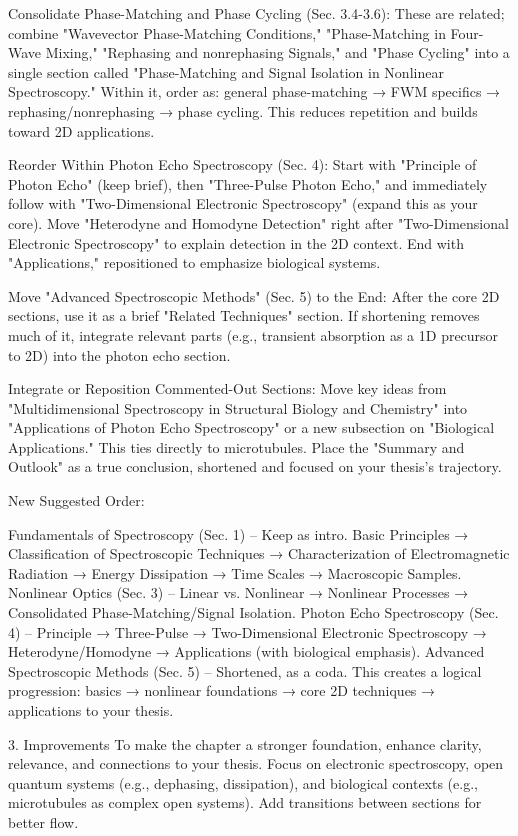 {Consolidate Phase-Matching and Phase Cycling (Sec. 3.4-3.6): These are related; combine "Wavevector Phase-Matching Conditions," "Phase-Matching in Four-Wave Mixing," "Rephasing and nonrephasing Signals," and "Phase Cycling" into a single section called "Phase-Matching and Signal Isolation in Nonlinear Spectroscopy." Within it, order as: general phase-matching → FWM specifics → rephasing/nonrephasing → phase cycling. This reduces repetition and builds toward 2D applications.

Reorder Within Photon Echo Spectroscopy (Sec. 4): Start with "Principle of Photon Echo" (keep brief), then "Three-Pulse Photon Echo," and immediately follow with "Two-Dimensional Electronic Spectroscopy" (expand this as your core). Move "Heterodyne and Homodyne Detection" right after "Two-Dimensional Electronic Spectroscopy" to explain detection in the 2D context. End with "Applications," repositioned to emphasize biological systems.

Move "Advanced Spectroscopic Methods" (Sec. 5) to the End: After the core 2D sections, use it as a brief "Related Techniques" section. If shortening removes much of it, integrate relevant parts (e.g., transient absorption as a 1D precursor to 2D) into the photon echo section.

Integrate or Reposition Commented-Out Sections: Move key ideas from "Multidimensional Spectroscopy in Structural Biology and Chemistry" into "Applications of Photon Echo Spectroscopy" or a new subsection on "Biological Applications." This ties directly to microtubules. Place the "Summary and Outlook" as a true conclusion, shortened and focused on your thesis's trajectory.

New Suggested Order:

Fundamentals of Spectroscopy (Sec. 1) – Keep as intro.
Basic Principles → Classification of Spectroscopic Techniques → Characterization of Electromagnetic Radiation → Energy Dissipation → Time Scales → Macroscopic Samples.
Nonlinear Optics (Sec. 3) – Linear vs. Nonlinear → Nonlinear Processes → Consolidated Phase-Matching/Signal Isolation.
Photon Echo Spectroscopy (Sec. 4) – Principle → Three-Pulse → Two-Dimensional Electronic Spectroscopy → Heterodyne/Homodyne → Applications (with biological emphasis).
Advanced Spectroscopic Methods (Sec. 5) – Shortened, as a coda.
This creates a logical progression: basics → nonlinear foundations → core 2D techniques → applications to your thesis.

3. Improvements
To make the chapter a stronger foundation, enhance clarity, relevance, and connections to your thesis. Focus on electronic spectroscopy, open quantum systems (e.g., dephasing, dissipation), and biological contexts (e.g., microtubules as complex open systems). Add transitions between sections for better flow.

}
